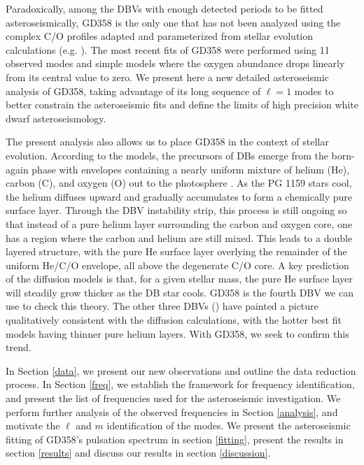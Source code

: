 \documentclass[12pt,preprint]{aastex}
\begin{document}
Paradoxically, among the DBVs with enough detected periods to be fitted 
asteroseismically, GD358 is the only one that has not been analyzed using the complex 
C/O profiles adapted and parameterized from stellar evolution calculations
(e.g. {}\citet{Salaris97,Althaus05}). The most recent fits of GD358 \citep{Metcalfe03c} were 
performed using 11 observed modes and simple models where the oxygen abundance 
drops linearly from its central value to zero. We present here a new detailed asteroseismic analysis 
of GD358, taking advantage of its long sequence of $\ell=1$ modes to better constrain 
the asteroseismic fits and define the limits of high precision white dwarf asteroseismology.  

The present analysis also allows us to place GD358 in the context of stellar evolution. 
According to the models, the precursors of DBs emerge from the born-again phase with 
envelopes containing a nearly uniform mixture of helium (He), carbon (C), and oxygen (O) 
out to the photosphere \citep{Dreizler98,Herwig99}. As the PG 1159 stars cool, the helium 
diffuses upward and gradually accumulates to form a chemically pure surface layer. Through 
the DBV instability strip, this process is still ongoing so that instead of a pure helium 
layer surrounding the carbon and oxygen core, one has a region where the carbon and helium 
are still mixed. This leads to a double layered structure, with the pure He surface layer 
overlying the remainder of the uniform He/C/O envelope, all above the degenerate C/O core. 
A key prediction of the diffusion models is that, for a given stellar mass, the pure He 
surface layer will steadily grow thicker as the DB star cools.  GD358 is the fourth DBV 
we can use to check this theory. The other three DBVs 
(\citet{Bischoff-Kim14,Sullivan08, Metcalfe03c}) have painted a picture qualitatively consistent with 
the diffusion calculations, with the hotter best fit models having thinner pure helium 
layers. With GD358, we seek to confirm this trend.

In Section \ref{data}, we present our new observations and outline the data reduction process.  
In Section \ref{freq}, we establish the framework for frequency identification, and present the 
list of frequencies used for the asteroseismic investigation. We perform further analysis of the observed 
frequencies in Section \ref{analysis}, and motivate the $\ell$ and $m$ identification of the modes. 
We present the asteroseismic fitting of GD358's pulsation spectrum in section \ref{fitting}, present 
the results in section \ref{results} and discuss our results in section \ref{discussion}.
\end{document}
